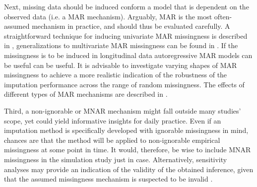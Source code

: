 \documentclass[bimj,fleqn]{w-art}
\begin{document}
Next, missing data should be induced conform a model that is dependent on the observed data (i.e. a MAR mechanism). Arguably, MAR is the most often-assumed mechanism in practice, and should thus be evaluated carefully. A straightforward technique for inducing univariate MAR missingness is described in \citet[][p. 63]{fimd}, generalizations to multivariate MAR missingness can be found in \citet{ampute}. If the missingness is to be induced in longitudinal data autoregressive MAR models can be useful \citep[see e.g.][model 2 and model 3]{shara2015randomly} can be useful. It is advisable to investigate varying shapes of MAR missingness to achieve a more realistic indication of the robustness of the imputation performance across the range of random missingness. The effects of different types of MAR mechanisms are described in \citet{scho18}.%

Third, a non-ignorable or MNAR mechanism might fall outside many studies' scope, yet could yield informative insights for daily practice. Even if an imputation method is specifically developed with ignorable missingness in mind, chances are that the method will be applied to non-ignorable empirical missingness at some point in time. It would, therefore, be wise to include MNAR missingness in the simulation study just in case. Alternatively, sensitivity analyses may provide an indication of the validity of the obtained inference, given that the assumed missingness mechanism is suspected to be invalid \citep[see e.g.][part 5]{molenberghs2014handbook}.
\end{document}
